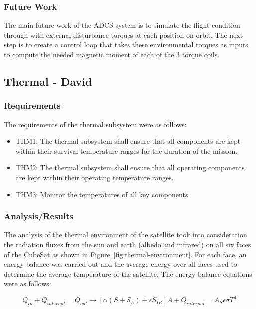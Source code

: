 \documentclass[12pt]{article}
\begin{document}
			\subsubsection{Future Work}
			The main future work of the ADCS system is to simulate the flight condition through with external disturbance torques at each position on orbit. The next step is to create a control loop that takes these environmental torques as inputs to compute the needed magnetic moment of each of the 3 torque coils. 

\newpage
\FloatBarrier

\subsection{Thermal - David}
		
\subsubsection{Requirements}

The requirements of the thermal subsystem were as follows:

\begin{itemize}
	\item THM1: The thermal subsystem shall ensure that all components are kept within their survival
temperature ranges for the duration of the mission.
\item THM2: The thermal subsystem shall ensure that all operating components are kept within their
operating temperature ranges.
\item THM3: Monitor the temperatures of all key components.
\end{itemize}


\subsubsection{Analysis/Results}

The analysis of the thermal environment of the satellite took into consideration the radiation fluxes from the sun and earth (albedo and infrared) on all six faces of the CubeSat as shown in Figure~\ref{fig:thermal-environment}. For each face, an energy balance was carried out and the average energy over all faces used to determine the average temperature of the satellite. The energy balance equations were as follows:

\begin{equation}
Q_{in} + Q_{internal} = Q_{out} \rightarrow [\alpha(S + S_A) + \epsilon S_{IR}] A + Q_{internal} = A_S \epsilon \sigma T^4
\label{eq:thermal-balance}
\end{equation}
\end{document}
